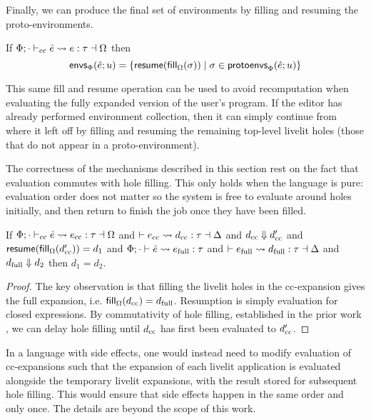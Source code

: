 Finally, we can produce the final set of environments by filling and resuming the proto-environments.
\begin{definition}
    If $\Phi; \cdot \vdash_\text{cc} \hat e \leadsto e : \tau \dashv \Omega$
    then \[\mathsf{envs}_{\Phi}(\hat e; u) = \{\mathsf{resume}(\mathsf{fill}_{\Omega}(\sigma)) \mid \sigma \in \mathsf{protoenvs}_{\Phi}(\hat e; u)\}\]
\end{definition}

This same fill and resume operation can be used to avoid recomputation when evaluating the fully expanded version of the user's program.
If the editor has already performed environment collection, then it can simply continue from where it left off
by filling and resuming
the remaining top-level livelit holes (those that do not appear in a proto-environment).

The correctness of the mechanisms described in this section rest on the fact that evaluation commutes with hole filling. 
This only holds when the language is pure: evaluation order does not matter 
so the system is free to evaluate around holes initially, 
and then return to finish the job once they have been filled. 

\begin{theorem}
    If $\Phi; \cdot \vdash_\text{cc} \hat e \leadsto e_\text{cc} : \tau \dashv \Omega$ and $\vdash e_\text{cc} \leadsto d_\text{cc} : \tau \dashv \Delta$
    and $d_\text{cc} \Downarrow d_\text{cc}'$ and $\mathsf{resume}(\mathsf{fill}_{\Omega}(d_\text{cc}')) = d_1$ 
    and $\Phi; \cdot \vdash \hat e \leadsto e_\text{full} : \tau$
    and $\vdash e_\text{full} \leadsto d_\text{full} : \tau \dashv \Delta$ 
    and $d_\text{full} \Downarrow d_2$ then $d_1 = d_2$.
\end{theorem}
\begin{proof}
    The key observation is that filling the livelit holes in the cc-expansion gives the full expansion,
    i.e. $\mathsf{fill}_{\Omega}(d_\text{cc}) = d_\text{full}$. Resumption is simply evaluation for closed expressions.
    By commutativity of hole filling, established in the prior work \cite{HazelnutLive}, 
    we can delay hole filling until $d_\text{cc}$ has first been evaluated to
    $d_\text{cc}'$.
\end{proof}

In a language with side effects, one would instead need to modify evaluation of  
cc-expansions such that the expansion of each livelit application is evaluated alongside the 
temporary livelit expansions,
with the result stored for subsequent hole filling. This would ensure that
side effects happen in the same order and only once. The details are beyond the scope of this work.

